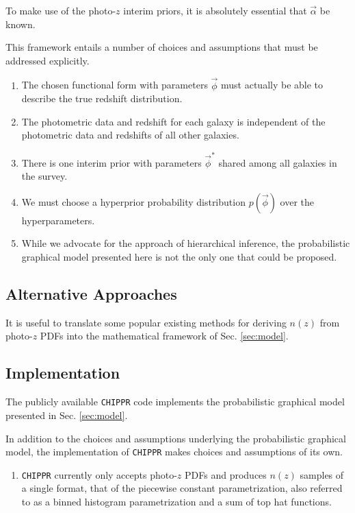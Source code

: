 \documentclass[iop]{emulateapj}
\newcommand{\chippr}{\texttt{CHIPPR} }
\begin{document}
To make use of the photo-$z$ interim priors, it is absolutely essential that $\vec{\alpha}$ be known.  

This framework entails a number of choices and assumptions that must be addressed explicitly.

\begin{enumerate}
	\item The chosen functional form with parameters $\vec{\phi}$ must actually be able to describe the true redshift distribution.
	\item The photometric data and redshift for each galaxy is independent of the photometric data and redshifts of all other galaxies.
	\item There is one interim prior with parameters $\vec{\phi}^{*}$ shared among all galaxies in the survey.
	\item We must choose a hyperprior probability distribution $p(\vec{\phi})$ over the hyperparameters.
	\item While we advocate for the approach of hierarchical inference, the probabilistic graphical model presented here is not the only one that could be proposed.
\end{enumerate}

\subsection{Alternative Approaches}
\label{sec:others}

It is useful to translate some popular existing methods for deriving $n(z)$ from photo-$z$ PDFs into the mathematical framework of Sec. \ref{sec:model}.

\subsection{Implementation}
\label{sec:implementation}

The publicly available \chippr code implements the probabilistic graphical model presented in Sec. \ref{sec:model}.  

In addition to the choices and assumptions underlying the probabilistic graphical model, the implementation of \chippr makes choices and assumptions of its own.

\begin{enumerate}
	\item \chippr currently only accepts photo-$z$ PDFs and produces $n(z)$ samples of a single format, that of the piecewise constant parametrization, also referred to as a binned histogram parametrization and a sum of top hat functions.
\end{enumerate}
\end{document}
